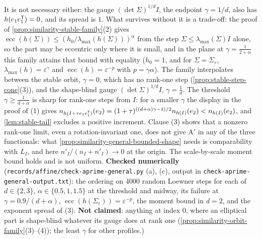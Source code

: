 \begin{proposition}
{It is not necessary either: the gauge $(\det\Sigma)^{1/d}I$, the endpoint $\gamma = 1/d$, also has
$h(e_1e_1^{\mathsf{T}}) = 0$, and its spread is $1$. What survives without it
is a trade-off: the proof of \ref{prop:similarity-stable-family}(2) gives
$\operatorname{ecc}(h(\Sigma)) \le (h_0/\lambda_{\max}(h(\Sigma)))^\alpha$ from the step $\Sigma \le \lambda_{\max}(\Sigma)I$
alone, so the part may be eccentric only where it is small, and in the plane at
$\gamma = \tfrac1{2+\alpha}$ this family attains that bound with equality ($h_0 = 1$, and for
$\Sigma = \Sigma_\varepsilon$, $\lambda_{\max}(h) = \varepsilon^\gamma$ and $\operatorname{ecc}(h) = \varepsilon^{-p}$ with $p = \gamma\alpha$). The
family interpolates between the stable orbit, $\gamma = 0$, which has no rank-one step
(\ref{prop:stable-step-cone}(3)), and the shape-blind gauge $(\det\Sigma)^{1/d}I$, $\gamma = \tfrac1d$. The
threshold $\gamma \ge \tfrac1{d+\alpha}$ is sharp for rank-one steps from $I$: for a smaller $\gamma$ the display in
the proof of (1) gives $n_{h(I + \tau e_1e_1^{\mathsf{T}})}(e_2) = (1+\tau)^{((d+\alpha)\gamma - 1)/2}n_{h(I)}(e_2) <
n_{h(I)}(e_2)$, and \ref{lem:stable-tail} excludes a positive increment. Clause (3) shows that a
nonzero rank-one limit, even a rotation-invariant one, does not give A$'$ in any of the three
functionals: what \ref{prop:similarity-general-bounded-shape} needs is comparability with $L_I$, and
here $n'_I/(n_I + n'_I) \to 0$ at the origin. The scale-by-scale moment bound holds and is not
uniform. \textbf{Checked numerically} (\texttt{records/affine/check-aprime-general.py} (a), (c), output in
\texttt{check-aprime-general-output.txt}): the ordering on 4000 random Loewner steps for each of
$d \in \{2,3\}$, $\alpha \in \{0.5, 1, 1.5\}$ at the threshold and midway, its failure at
$\gamma = 0.9/(d+\alpha)$, $\operatorname{ecc}(h(\Sigma_\varepsilon)) = \varepsilon^{-p}$, the moment bound in $d = 2$, and the
exponent spread of (3). \textbf{Not claimed}: anything at \Levy{} index $0$, where an elliptical part
is shape-blind whatever its gauge does at rank one (\ref{prop:similarity-orbit-family}(3)--(4)); the
least $\gamma$ for other profiles.)}
\end{proposition}

